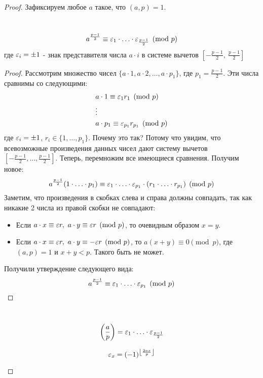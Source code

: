 \begin{proof}
	Зафиксируем любое $a$ такое, что $(a, p) = 1$.
	\begin{proposition}~
		\[
			a^{\frac{p - 1}{2}} \equiv \varepsilon_1 \cdot \ldots \cdot \varepsilon_{\frac{p - 1}{2}} \pmod p
		\]
		где $\varepsilon_i = \pm 1$ - знак представителя числа $a \cdot i$ в системе вычетов $\left[-\frac{p - 1}{2},\ \frac{p - 1}{2}\right]$
	\end{proposition}

	\begin{proof}
		Рассмотрим множество чисел $\{a \cdot 1, a \cdot 2, \ldots, a \cdot p_1\}$, где $p_1 = \frac{p - 1}{2}$. Эти числа сравнимы со следующими:
		\begin{align*}
			&{a \cdot 1 \equiv \varepsilon_1 r_1 \pmod p}
			\\
			&\vdots
			\\
			&{a \cdot p_1 \equiv \varepsilon_{p_1} r_{p_1} \pmod p}
		\end{align*}
		где $\varepsilon_i = \pm 1$, $r_i \in \{1, \ldots, p_1\}$. Почему это так? Потому что увидим, что всевозможные произведения данных чисел дают систему вычетов $\left[-\frac{p - 1}{2}, \ldots, \frac{p - 1}{2}\right]$. Теперь, перемножим все имеющиеся сравнения. Получим новое:
		\[
			a^{\frac{p - 1}{2}} (1 \cdot \ldots \cdot p_1) \equiv \varepsilon_1 \cdot \ldots \cdot \varepsilon_{p_1} \cdot (r_1 \cdot \ldots \cdot r_{p_1}) \pmod p
		\]
		Заметим, что произведения в скобках слева и справа должны совпадать, так как никакие 2 числа из правой скобки не совпадают:
		\begin{itemize}
			\item Если $a \cdot x \equiv \varepsilon r,\ a \cdot y \equiv \varepsilon r \pmod p$, то очевидным образом $x = y$.
			
			\item Если $a \cdot x \equiv \varepsilon r,\ a \cdot y \equiv -\varepsilon r \pmod p$, то $a(x + y) \equiv 0 \pmod p$, где $(a, p) = 1$ и $x + y < p$. Такого быть не может.
		\end{itemize}
	
		Получили утверждение следующего вида:
		\[
			a^{\frac{p - 1}{2}} \equiv \varepsilon_1 \cdot \ldots \cdot \varepsilon_{p_1} \pmod p
		\]
	\end{proof}

	\begin{corollary}~
		\[
			\left(\frac{ a }{ p }\right) = \varepsilon_1 \cdot \ldots \cdot \varepsilon_{\frac{p - 1}{2}}
		\]
	\end{corollary}
	
	\begin{proposition}
		\[\varepsilon_x = (-1)^{\left\lfloor \frac{2ax}{p} \right\rfloor}\]
	\end{proposition}


\end{proof}
